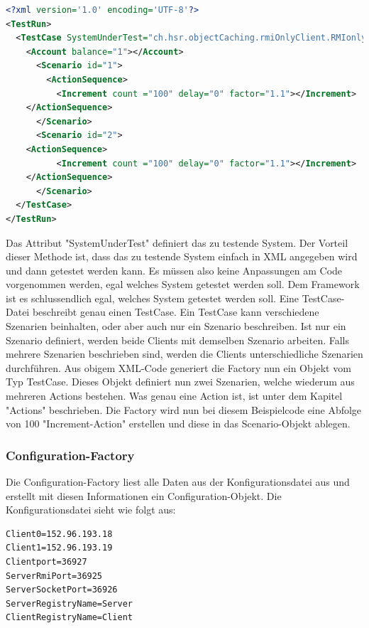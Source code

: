 \begin{lstlisting}[language=XML, breaklines=true] 	
<?xml version='1.0' encoding='UTF-8'?>
<TestRun>
  <TestCase SystemUnderTest="ch.hsr.objectCaching.rmiOnlyClient.RMIonlyClientSystem">
    <Account balance="1"></Account>
      <Scenario id="1">
        <ActionSequence>
          <Increment count ="100" delay="0" factor="1.1"></Increment>
	</ActionSequence>
      </Scenario>
      <Scenario id="2">
	<ActionSequence>
          <Increment count ="100" delay="0" factor="1.1"></Increment>
	</ActionSequence>
      </Scenario>
  </TestCase>
</TestRun>
\end{lstlisting}

Das Attribut "SystemUnderTest" definiert das zu testende System. Der Vorteil dieser Methode ist, dass das zu testende System einfach in XML angegeben wird und dann getestet werden kann. Es müssen also keine Anpassungen am Code vorgenommen werden, egal welches System getestet werden soll. Dem Framework ist es schlussendlich egal, welches System getestet werden soll.\newline
Eine TestCase-Datei beschreibt genau einen TestCase. Ein Test\-Case kann ver\-schie\-dene Sze\-na\-ri\-en be\-in\-hal\-ten, oder aber auch nur ein Szena\-rio be\-schrei\-ben. Ist nur ein Sz\-enario definiert, werden beide Clients mit dem\-selben Szenario arbeiten. Falls mehrere Szenarien beschrieben sind, werden die Clients unterschiedliche Szenarien durchführen. \newline
Aus obigem XML-Code generiert die Factory nun ein Objekt vom Typ TestCase. Dieses Objekt definiert nun zwei Szenarien, welche wiederum aus mehreren Actions bestehen. Was genau eine Action ist, ist unter dem Kapitel "Actions" beschrieben. Die Factory wird nun bei diesem Beispielcode eine Abfolge von 100 "Increment-Action" erstellen und diese in das Scenario-Objekt ablegen.


\subsubsection{Configuration-Factory}
\label{sec:configurationFactory}
Die Configuration-Factory liest alle Daten aus der Konfigurationsdatei aus und erstellt mit diesen Informationen ein Configuration-Objekt. Die Konfigurationsdatei sieht wie folgt aus:
\begin{lstlisting}
Client0=152.96.193.18
Client1=152.96.193.19
Clientport=36927
ServerRmiPort=36925
ServerSocketPort=36926
ServerRegistryName=Server
ClientRegistryName=Client
\end{lstlisting}

